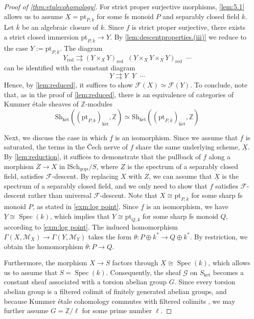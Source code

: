 \documentclass[10pt]{amsart}
\newcommand{\Z}{\mathbb{Z}}
\newcommand{\cF}{\mathcal{F}}
\newcommand{\cM}{\mathcal{M}}
\DeclareMathOperator{\Spec}{Spec}
\newcommand{\ul}{\underline}
\newcommand{\ol}{\overline}
\newcommand{\ket}{\mathrm{k\acute{e}t}}
\newcommand{\Sh}{\mathrm{Sh}}
\newcommand{\lSch}{\mathrm{lSch}}
\DeclareMathOperator{\rightrightrightarrows}{\substack{\rightarrow \\[-1em] \rightarrow \\[-1em] \rightarrow}}
\DeclareMathOperator{\rightrightrightrightarrows}{\substack{\rightarrow\\[-1em] \rightarrow \\[-1em] \rightarrow\\[-1em] \rightarrow}}
\newcommand{\pt}{\mathrm{pt}}
\newcommand{\red}{\mathrm{red}}
\begin{document}
\begin{proof}[Proof of \cref{thm:etalecohomology}]
For strict proper surjective morphisms, 
\cref{lem:5.1} allows us to assume $\ul{X}=\pt_{P,k}$ for some fs monoid $P$ 
and separably closed field $k$.
Let $\ol{k}$ be an algebraic closure of $k$.
Since $f$ is strict proper surjective,
there exists a strict closed immersion $\pt_{P,\ol{k}}\to Y$.
By \ref{lem:descentproperties.(iii)}
we reduce to the case $Y:=\pt_{P,\ol{k}}$.
The diagram
\[
Y_\red
\rightrightarrows
(Y\times_X Y)_\red
\rightrightrightarrows
(Y\times_X Y\times_X Y)_\red
\rightrightrightrightarrows
\cdots
\]
can be identified with the constant diagram
\[
Y
\rightrightarrows
Y
\rightrightrightarrows
Y
\rightrightrightrightarrows
\cdots
\]
Hence, by \cref{lem:reduced},
it suffices to show $\cF(X)\simeq \cF(Y)$.
To conclude, note that, 
as in the proof of \cref{lem:reduced}, 
there is an equivalence of categories of Kummer \'etale sheaves of $\Z$-modules
\[
\Sh_\ket((\pt_{P,k})_{\ket},\Z)
\simeq
\Sh_\ket((\pt_{P,\ol{k}})_{\ket},\Z)
\]


Next, we discuss the case in which \(\ul{f}\) is an isomorphism. Since we assume that \(f\) is saturated, 
the terms in the \v{C}ech nerve of \(f\) share the same underlying scheme, \(\ul{X}\). 
By \cref{lem:reduction}, it suffices to demonstrate that the pullback of \(f\) along a morphism \(Z \to X\) in \(\lSch_{qcqs}/S\), where \(\ul{Z}\) is the spectrum of a separably closed field, satisfies \(\cF\)-descent. 
By replacing \(X\) with \(Z\), we can assume that \(\ul{X}\) is the spectrum of a separably closed field, and we only need to show that \(f\) satisfies \(\cF\)-descent rather than universal \(\cF\)-descent. 
Note that \(X \cong \pt_{P,k}\) for some sharp fs monoid \(P\), as stated in \cref{exm:log point}. Since \(\ul{f}\) is an isomorphism, we have \(\ul{Y} \cong \Spec(k)\), which implies that \(Y \cong \pt_{Q,k}\) for some sharp fs monoid \(Q\), according to \cref{exm:log point}. 
The induced homomorphism \(\Gamma(X,\cM_X) \to \Gamma(Y,\cM_Y)\) takes the form \(\theta: P \oplus k^* \to Q \oplus k^*\). By restriction, we obtain the homomorphism \(\ol{\theta}: P \to Q\).

Furthermore, the morphism \( X \to S \) factors through \( \ul{X} \cong \Spec(k) \), which allows us to assume that \( S = \Spec(k) \). Consequently, the sheaf \( \mathcal{G} \) on \( S_\text{ket} \) becomes a constant sheaf associated with a torsion abelian group \( G \). Since every torsion abelian group is a filtered colimit of finitely generated abelian groups, and because Kummer étale cohomology commutes with filtered colimits \cite[Lemma 5.3]{MR3658728}, we may further assume \( G = \mathbb{Z}/\ell \) for some prime number \( \ell \).


\end{proof}
\end{document}

